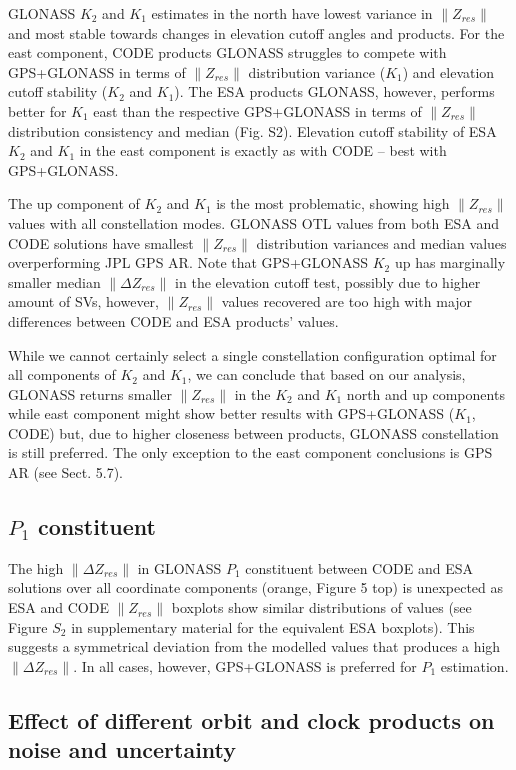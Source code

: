 \documentclass[se, manuscript]{copernicus}
\begin{document}
GLONASS $K_2$ and $K_1$ estimates in the north have lowest variance in $\|Z_{res}\|$ and most stable towards changes in elevation cutoff angles and products. For the east component, CODE products GLONASS struggles to compete with GPS+GLONASS in terms of $\|Z_{res}\|$ distribution variance ($K_1$) and elevation cutoff stability ($K_2$ and $K_1$). The ESA products GLONASS, however, performs better for $K_1$ east than the respective GPS+GLONASS in terms of $\|Z_{res}\|$ distribution consistency and median (Fig. S2). Elevation cutoff stability of ESA $K_2$ and $K_1$ in the east component is exactly as with CODE – best with GPS+GLONASS.

The up component of $K_2$ and $K_1$ is the most problematic, showing high $\|Z_{res}\|$ values with all constellation modes. GLONASS OTL values from both ESA and CODE solutions have smallest $\|Z_{res}\|$ distribution variances and median values overperforming JPL GPS AR. Note that GPS+GLONASS $K_2$ up has marginally smaller median $\|\Delta Z_{res}\|$ in the elevation cutoff test, possibly due to higher amount of SVs, however, $\|Z_{res}\|$ values recovered are too high with major differences between CODE and ESA products’ values.

While we cannot certainly select a single constellation configuration optimal for all components of $K_2$ and $K_1$, we can conclude that based on our analysis, GLONASS returns smaller $\|Z_{res}\|$ in the $K_2$ and $K_1$ north and up components while east component might show better results with GPS+GLONASS ($K_1$, CODE) but, due to higher closeness between products, GLONASS constellation is still preferred. The only exception to the east component conclusions is GPS AR (see Sect. 5.7).

\subsection{$P_1$ constituent}
The high $\|\Delta Z_{res}\|$ in GLONASS $P_1$ constituent between CODE and ESA solutions over all coordinate components (orange, Figure 5 top) is unexpected as ESA and CODE $\|Z_{res}\|$ boxplots show similar distributions of values (see Figure $S_2$ in supplementary material for the equivalent ESA boxplots). This suggests a symmetrical deviation from the modelled values that produces a high $\|\Delta Z_{res}\|$. In all cases, however, GPS+GLONASS is preferred for $P_1$ estimation.

\subsection{Effect of different orbit and clock products on noise and uncertainty}
\end{document}
